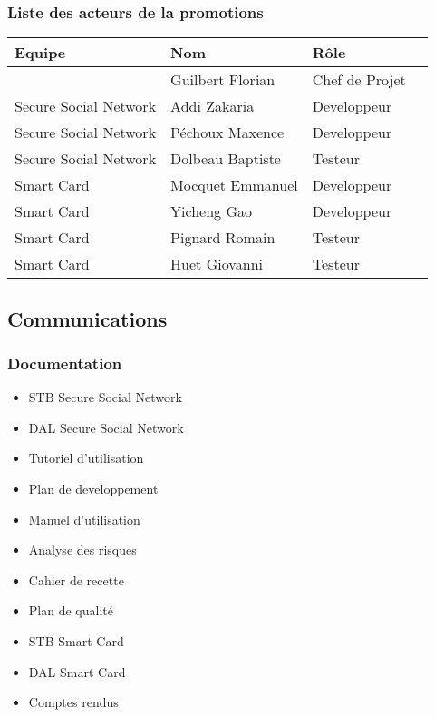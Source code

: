 \documentclass[a4paper,11pt,french]{article}
\begin{document}
\subsubsection{Liste des acteurs de la promotions}
\begin{center}
	\begin{tabularx}{16cm}{|X|X|X|X|}
	\hline
	\bfseries{Equipe} & \bfseries{Nom} & \bfseries{Rôle}\\
	\hline
		& Guilbert Florian & Chef de Projet\\
	\hline
	Secure Social Network & Addi Zakaria & Developpeur\\
	\hline
	Secure Social Network & Péchoux Maxence & Developpeur\\
	\hline
	Secure Social Network & Dolbeau Baptiste & Testeur\\
	\hline
	Smart Card & Mocquet Emmanuel & Developpeur\\
	\hline
	Smart Card & Yicheng Gao & Developpeur\\
	\hline
	Smart Card & Pignard Romain & Testeur\\
	\hline
	Smart Card & Huet Giovanni & Testeur\\
	\hline
	\end{tabularx}
\end{center}
\vspace*{0cm}

\subsection{Communications}
\subsubsection{Documentation}
\begin{itemize}
	\item STB Secure Social Network
	\item DAL Secure Social Network
	\item Tutoriel d'utilisation
	\item Plan de developpement
	\item Manuel d'utilisation
	\item Analyse des risques
	\item Cahier de recette
	\item Plan de qualité
	\item STB Smart Card
	\item DAL Smart Card
	\item Comptes rendus
\end{itemize}
\end{document}
